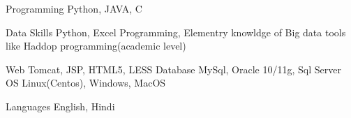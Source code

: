 

\begin{cvskills}

  \cvskill
    {Programming} %
    {Python, JAVA, C} %

  \cvskill
    {Data Skills} %
    {Python, Excel Programming, Elementry knowldge of Big data tools like Haddop programming(academic level)} %


  \cvskill
    {Web} %
    {Tomcat, JSP, HTML5, LESS} %
  \cvskill
    {Database} %
    {MySql, Oracle 10/11g, Sql Server} %
  \cvskill
    {OS} %
    {Linux(Centos), Windows, MacOS} %



  \cvskill
    {Languages} %
    {English, Hindi} %

\end{cvskills}
